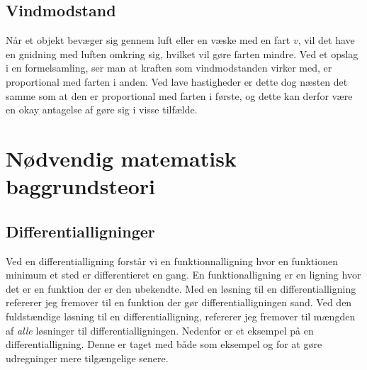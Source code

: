 \subsection{Vindmodstand}\label{teori:vindmodstand}
Når et objekt bevæger sig gennem luft eller en væske med en fart $v$, vil det have en gnidning med luften omkring sig, hvilket vil gøre farten mindre.
Ved et opslag i en formelsamling, ser man at kraften som vindmodstanden virker med, er proportional med farten i anden. 
Ved lave hastigheder er dette dog næsten det samme som at den er proportional med farten i første, og dette kan derfor være en okay antagelse af gøre sig i visse tilfælde.


\section{Nødvendig matematisk baggrundsteori}
\subsection{Differentialligninger}
\newcommand{\LosEks}{$ \{ c\cdot e^{kx}|c\in \mR \} $}%
Ved en differentialligning forstår vi en funktionnalligning hvor en funktionen minimum et sted er differentieret en gang.
En funktionalligning er en ligning hvor det er en funktion der er den ubekendte. 
Med en løsning til en differentialligning refererer jeg fremover til en funktion der gør differentialligningen sand. 
Ved den fuldstændige løsning til en differentialligning, refererer jeg fremover til mængden af \emph{alle} løsninger til differentialligningen. 
Nedenfor er et eksempel på en differentialligning. 
Denne er taget med både som eksempel og for at gøre udregninger mere tilgængelige senere.

